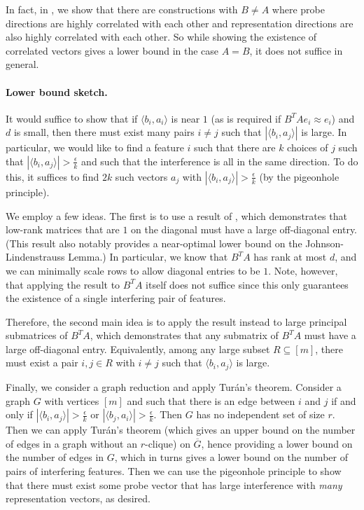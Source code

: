 \documentclass[10pt]{article}
\begin{document}
\begin{ReviewVerbatim}
In fact, in , we show that there are constructions with $B\neq A$ where probe directions are highly correlated with each other and representation directions are also highly correlated with each other. So while showing the existence of correlated vectors gives a lower bound in the case $A=B$, it does not suffice in general.

\paragraph{Lower bound sketch.}
It would suffice to show that if $\langle b_i, a_i\rangle$ is near $1$ (as is required if $B^TAe_i \approx e_i$) and $d$ is small, then there must exist many pairs $i\neq j$ such that $|\langle b_i, a_j \rangle|$ is large. In particular, we would like to find a feature $i$ such that there are $k$ choices of $j$ such that $|\langle b_i, a_j \rangle| > \frac{\epsilon}{k}$ and such that the interference is all in the same direction. To do this, it suffices to find $2k$ such vectors $a_j$ with $|\langle b_i, a_j \rangle| > \frac{\epsilon}{k}$ (by the pigeonhole principle).

We employ a few ideas. The first is to use a result of \cite{alon2003problems}, which demonstrates that low-rank matrices that are $1$ on the diagonal must have a large off-diagonal entry. (This result also notably provides a near-optimal lower bound on the Johnson-Lindenstrauss Lemma.) In particular, we know that $B^TA$ has rank at most $d$, and we can minimally scale rows to allow diagonal entries to be $1$. Note, however, that applying the result to $B^TA$ itself does not suffice since this only guarantees the existence of a single interfering pair of features.

Therefore, the second main idea is to apply the result instead to large principal submatrices of $B^TA$, which demonstrates that any submatrix of $B^TA$ must have a large off-diagonal entry. Equivalently, among any large subset $R\subseteq [m]$, there must exist a pair $i,j\in R$ with $i\neq j$ such that $\langle b_i, a_j \rangle$ is large.

Finally, we consider a graph reduction and apply Tur\'an's theorem. Consider a graph $G$ with vertices $[m]$ and such that there is an edge between $i$ and $j$ if and only if $|\langle b_i, a_j\rangle| > \frac{\epsilon}{k}$ or $|\langle b_j, a_i\rangle| > \frac{\epsilon}{k}$. Then $G$ has no independent set of size $r$. Then we can apply Tur\'an's theorem (which gives an upper bound on the number of edges in a graph without an $r$-clique) on $\overline{G}$, hence providing a lower bound on the number of edges in $G$, which in turns gives a lower bound on the number of pairs of interfering features. Then we can use the pigeonhole principle to show that there must exist some probe vector that has large interference with \textit{many} representation vectors, as desired.


\end{ReviewVerbatim}
\end{document}
